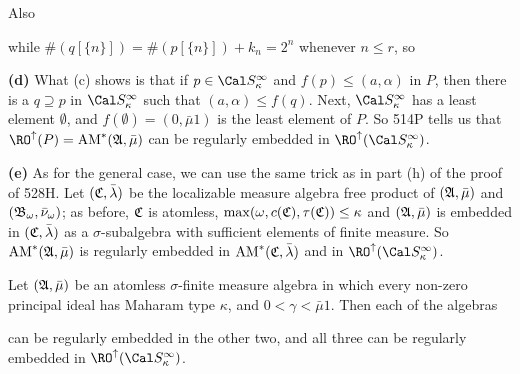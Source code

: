 {\noindent Also


\noindent while $\#(q[\{n\}])=\#(p[\{n\}])+k_n=2^n$ whenever $n\le r$,
so


\medskip

{\bf (d)} What (c) shows is that if $p\in\Cal S_{\kappa}^{\infty}$ and
$f(p)\le(a,\alpha)$ in $P$, then there is a $q\supseteq p$ in
$\Cal S_{\kappa}^{\infty}$ such that $(a,\alpha)\le f(q)$.
Next, $\Cal S^{\infty}_{\kappa}$ has a least element $\emptyset$, and
$f(\emptyset)=(0,\bar\mu 1)$ is the least element of $P$.   So 514P tells
us that
$\RO^{\uparrow}(P)=\AM^*(\frak A,\bar\mu)$ can be regularly embedded in
$\RO^{\uparrow}(\Cal S_{\kappa}^{\infty})$.

\medskip

{\bf (e)} As for the general case, we can use the same trick as in
part (h) of the proof of 528H.   Let $(\frak C,\bar\lambda)$ be the
localizable measure algebra free product of $(\frak A,\bar\mu)$ and
$(\frak B_{\omega},\bar\nu_{\omega})$;  as before, $\frak C$ is atomless,
$\max(\omega,c(\frak C),\tau(\frak C))\le\kappa$ and $(\frak A,\bar\mu)$
is embedded in $(\frak C,\bar\lambda)$ as a $\sigma$-subalgebra with
sufficient elements of finite measure.   So
$\mathop{\text{AM}}^*(\frak A,\bar\mu)$ is regularly embedded in
$\mathop{\text{AM}}^*(\frak C,\bar\lambda)$ and in
$\RO^{\uparrow}(\Cal S_{\kappa}^{\infty})$.
}%

 Let
$(\frak A,\bar\mu)$ be an atomless $\sigma$-finite measure algebra in which
every non-zero principal ideal has Maharam type $\kappa$,
and $0<\gamma<\bar\mu 1$.   Then each of the algebras


\noindent can be regularly embedded in the other two, and all three can
be regularly embedded in $\RO^{\uparrow}(\Cal S_{\kappa}^{\infty})$.


